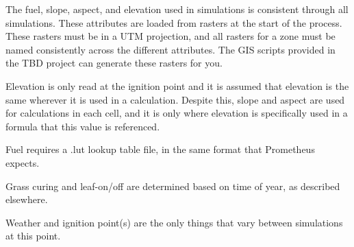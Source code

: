 The fuel, slope, aspect, and elevation used in simulations is consistent through all simulations. These attributes are loaded from rasters at the start of the process. These rasters must be in a U\+TM projection, and all rasters for a zone must be named consistently across the different attributes. The G\+IS scripts provided in the T\+BD project can generate these rasters for you.

Elevation is only read at the ignition point and it is assumed that elevation is the same wherever it is used in a calculation. Despite this, slope and aspect are used for calculations in each cell, and it is only where elevation is specifically used in a formula that this value is referenced.

Fuel requires a .lut lookup table file, in the same format that Prometheus expects.

Grass curing and leaf-\/on/off are determined based on time of year, as described elsewhere.

Weather and ignition point(s) are the only things that vary between simulations at this point. 